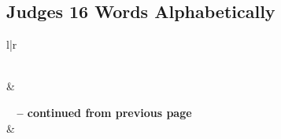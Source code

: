 

\subsection{Judges 16 Words Alphabetically}


\normalsize
 
\begin{center}
\begin{longtable}{l|r}
\caption[Judges 16 Words Alphabetically]{Judges 16 Words Alphabetically}\label{table:WordsAlphabetically for Judges 16} \\
\hline {} &  \\ \hline 
\endfirsthead
 
{{\bfseries \tablename\ \thetable{} -- continued from previous page}} \\  
\hline {} &  \\ \hline 
\endhead
 

\end{longtable}
\end{center}
